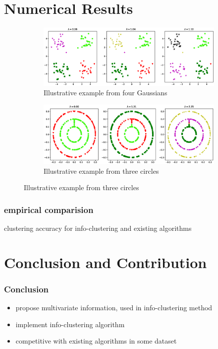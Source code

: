 \documentclass{beamer}
\begin{document}
\section{Numerical Results}
\begin{frame}
\begin{figure}[!ht]
\centering
\begin{subfigure}{\textwidth}
\includegraphics[width=12cm]{pic/4part.eps}
\caption{Illustrative example from four Gaussians}\label{fig:4p}
\end{subfigure}
\begin{subfigure}{\textwidth}
\includegraphics[width=12cm]{pic/3circle.eps}
\caption{Illustrative example from three circles}\label{fig:3c}
\end{subfigure}
\end{figure}
\end{frame}
\begin{frame}
\frametitle{empirical comparision}
\begin{table}[!ht]
\centering

\caption{clustering accuracy for info-clustering and existing algorithms}
\end{table}
\end{frame}
\section{Conclusion and Contribution}
\begin{frame}
\frametitle{Conclusion}
\begin{itemize}
\item propose multivariate information, used in info-clustering method
\item implement info-clustering algorithm
\item competitive with existing algorithms in some dataset
\end{itemize}
\end{frame}
\end{document}
